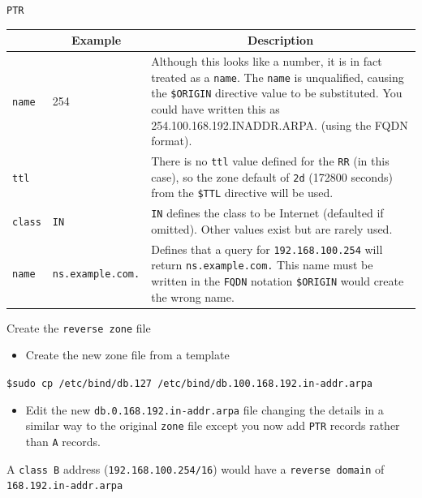 \documentclass[xcolor=table]{beamer}
\begin{document}
\begin{frame}{\texttt{PTR}}
  \begin{table}
    \tiny
    \begin{tabular}{|p{1.6cm}|p{1.6cm}|p{4.7cm}|} 
      \hline
      \rowcolor{gray}
      \multicolumn{1}{|c|}{Syntax} & \multicolumn{1}{c|}{Example} & \multicolumn{1}{c|}{Description}\\ 
      \hline
      \texttt{name}&254&Although this looks like a number, it is in fact treated as a \texttt{name}. The \texttt{name} is unqualified, causing the \texttt{\$ORIGIN} directive value to be substituted. You could have written this as 254.100.168.192.INADDR.ARPA. (using the FQDN format).\\
      \hline
      \texttt{ttl}&&There is no \texttt{ttl} value defined for the \texttt{RR} (in this case), so the zone default of \texttt{2d} (172800 seconds) from the \texttt{\$TTL} directive will be used.\\
      \hline
      \texttt{class}&\texttt{IN}&\texttt{IN} defines the class to be Internet (defaulted if omitted). Other values exist but are rarely used.\\
      \hline
      \texttt{name}&\texttt{ns.example.com.}&Defines that a query for \texttt{192.168.100.254} will return \texttt{ns.example.com.} This name must be written in the \texttt{FQDN} notation \texttt{\$ORIGIN} would create the wrong name.\\
      \hline
    \end{tabular}
  \end{table}
\end{frame}

\begin{frame}{Create the \texttt{reverse zone} file}
  \begin{itemize}
    \item Create the new zone file from a template
  \end{itemize}
  \begin{tcolorbox}
    \begin{center}
      \texttt{\scriptsize\$sudo cp /etc/bind/db.127 /etc/bind/db.100.168.192.in-addr.arpa}
    \end{center}
  \end{tcolorbox}
  \begin{itemize}
    \item  Edit the new \texttt{db.0.168.192.in-addr.arpa} file changing the details in a similar way to the original \texttt{zone} file except you now add \texttt{PTR} records rather than \texttt{A} records.
  \end{itemize}
  \begin{tcolorbox}[title={\textbf{NOTE:}}]
    \begin{center}
      \scriptsize A \texttt{class B} address (\texttt{192.168.100.254/16}) would have a \texttt{reverse domain} of \texttt{168.192.in-addr.arpa}
    \end{center}
  \end{tcolorbox}
\end{frame}
\end{document}
